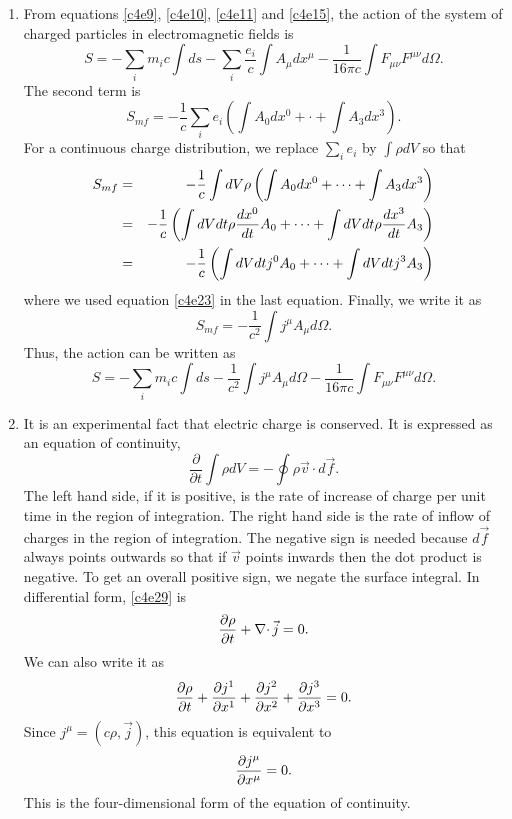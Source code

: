\begin{enumerate}
\item From equations \eqref{c4e9}, \eqref{c4e10}, \eqref{c4e11} and 
\eqref{c4e15}, the action of the system of charged particles in 
electromagnetic fields is
\[
S = -\sum_i m_ic\int ds - 
\sum_i\frac{e_i}{c}\int A_\mu dx^\mu - \frac{1}{16\pi c}
\int F_{\mu\nu} F^{\mu\nu} d\Omega.
\]
The second term is
\[
S_{mf} = -\frac{1}{c}\sum_i e_i\left(\int A_0dx^0 + \cdot + \int A_3dx^3\right).
\]
For a continuous charge distribution, we replace $\sum_i e_i$ by $\int \rho dV$
so that
\begin{eqnarray*}
S_{mf} &=& -\frac{1}{c}\int dV \rho\left(\int A_0dx^0 + \cdots + 
\int A_3dx^3\right) \\
 &=& -\frac{1}{c}\left(\int dVdt \rho\frac{d{x^0}}{d{t}}A_0 + \cdots + 
 \int dVdt \rho\frac{d{x^3}}{d{t}}A_3\right) \\
 &=& -\frac{1}{c}\left(\int dVdt j^0A_0 + \cdots + \int dVdt j^3A_3\right)
\end{eqnarray*}
where we used equation \eqref{c4e23} in the last equation. Finally, we write it
as
\begin{equation}\label{c4e27}
S_{mf} = -\frac{1}{c^2}\int j^\mu A_\mu d\Omega.
\end{equation}
Thus, the action can be written as
\begin{equation}\label{c4e28}
S = -\sum_i m_ic\int ds - \frac{1}{c^2}\int j^\mu A_\mu d\Omega - 
\frac{1}{16\pi c}\int F_{\mu\nu} F^{\mu\nu} d\Omega.
\end{equation}

\item It is an experimental fact that electric charge is conserved. It is 
expressed as an equation of continuity,
\begin{equation}\label{c4e29}
\frac{\partial}{\partial t}\int\rho dV = -\oint \rho\vec{v}\cdot d\vec{f}.
\end{equation}
The left hand side, if it is positive, is the rate of increase of charge per 
unit time in the region of integration. The right hand side is the rate of 
inflow of charges in the region of integration. The negative sign is needed 
because $d\vec{f}$ always points outwards so that if $\vec{v}$ points inwards 
then the dot product is negative. To get an overall positive sign, we negate 
the surface integral. In differential form, \eqref{c4e29} is
\begin{equation}\label{c4e30}
\frac{\partial{\rho}}{\partial{t}} + \operatorname{\nabla\cdot}\vec{j} = 0.
\end{equation}
We can also write it as
\[
\frac{\partial{\rho}}{\partial{t}} + \frac{\partial{j^1}}{\partial{x^1}} + \frac{\partial{j^2}}{\partial{x^2}} + \frac{\partial{j^3}}{\partial{x^3}} = 0.
\]
Since $j^\mu = (c\rho, \vec{j})$, this equation is equivalent to
\begin{equation}\label{c4e31}
\frac{\partial{j^\mu}}{\partial{x^\mu}} = 0.
\end{equation}
This is the four-dimensional form of the equation of continuity.


\end{enumerate}
